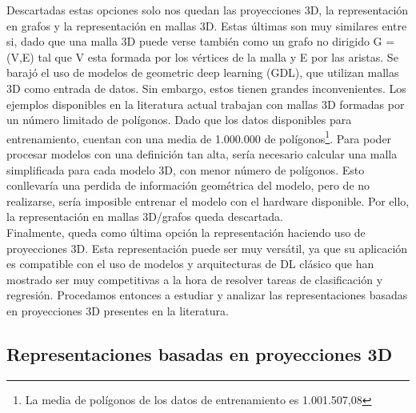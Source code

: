 
Descartadas estas opciones solo nos quedan las proyecciones 3D, la representación en grafos y la representación en mallas 3D. Estas últimas son muy similares entre si, dado que una malla 3D puede verse también como un grafo no dirigido G = (V,E) tal que V esta formada por los vértices de la malla y E por las aristas. Se barajó el uso de modelos de geometric deep learning (GDL), que utilizan mallas 3D como entrada de datos. Sin embargo, estos tienen grandes inconvenientes. Los ejemplos disponibles en la literatura actual trabajan con mallas 3D formadas por un número limitado de polígonos. Dado que los datos disponibles para entrenamiento, cuentan con una media de 1.000.000 de polígonos\footnote{La media de polígonos de los datos de entrenamiento es 1.001.507,08}. Para poder procesar modelos con una definición tan alta, sería necesario calcular una malla simplificada para cada modelo 3D, con menor número de polígonos. Esto conllevaría una perdida de información geométrica del modelo, pero de no realizarse, sería imposible entrenar el modelo con el hardware disponible. Por ello, la representación en mallas 3D/grafos queda descartada.\\


Finalmente, queda como última opción la representación haciendo uso de proyecciones 3D. Esta representación puede ser muy versátil, ya que su aplicación es compatible con el uso de modelos y arquitecturas de DL clásico que han mostrado ser muy competitivas a la hora de resolver tareas de clasificación y regresión. Procedamos entonces a estudiar y analizar las representaciones basadas en proyecciones 3D presentes en la literatura.

\subsection{Representaciones basadas en proyecciones 3D}

